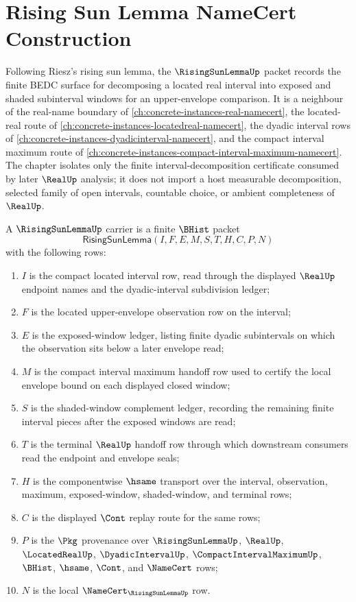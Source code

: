 \chapter{Rising Sun Lemma NameCert Construction}
\label{ch:concrete-instances-rising-sun-lemma-namecert}

Following Riesz's rising sun lemma, the $\RisingSunLemmaUp$ packet records the finite BEDC surface for decomposing a located real interval into exposed and shaded subinterval windows for an upper-envelope comparison. It is a neighbour of the real-name boundary of \autoref{ch:concrete-instances-real-namecert}, the located-real route of \autoref{ch:concrete-instances-locatedreal-namecert}, the dyadic interval rows of \autoref{ch:concrete-instances-dyadicinterval-namecert}, and the compact interval maximum route of \autoref{ch:concrete-instances-compact-interval-maximum-namecert}. The chapter isolates only the finite interval-decomposition certificate consumed by later $\RealUp$ analysis; it does not import a host measurable decomposition, selected family of open intervals, countable choice, or ambient completeness of $\RealUp$.

\begin{definition}
\label{def:rising-sun-carrier}
A $\RisingSunLemmaUp$ carrier is a finite $\BHist$ packet
$$
\mathsf{RisingSunLemma}(I,F,E,M,S,T,H,C,P,N)
$$
with the following rows:
\begin{enumerate}
\item $I$ is the compact located interval row, read through the displayed $\RealUp$ endpoint names and the dyadic-interval subdivision ledger;
\item $F$ is the located upper-envelope observation row on the interval;
\item $E$ is the exposed-window ledger, listing finite dyadic subintervals on which the observation sits below a later envelope read;
\item $M$ is the compact interval maximum handoff row used to certify the local envelope bound on each displayed closed window;
\item $S$ is the shaded-window complement ledger, recording the remaining finite interval pieces after the exposed windows are read;
\item $T$ is the terminal $\RealUp$ handoff row through which downstream consumers read the endpoint and envelope seals;
\item $H$ is the componentwise $\hsame$ transport over the interval, observation, maximum, exposed-window, shaded-window, and terminal rows;
\item $C$ is the displayed $\Cont$ replay route for the same rows;
\item $P$ is the $\Pkg$ provenance over $\RisingSunLemmaUp$, $\RealUp$, $\LocatedRealUp$, $\DyadicIntervalUp$, $\CompactIntervalMaximumUp$, $\BHist$, $\hsame$, $\Cont$, and $\NameCert$ rows;
\item $N$ is the local $\NameCert_{\RisingSunLemmaUp}$ row.
\end{enumerate}
\end{definition}

